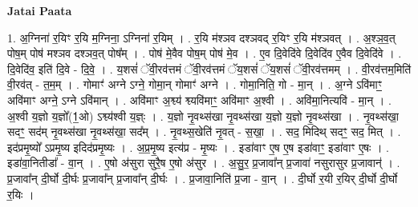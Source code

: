 \documentclass[17pt]{extarticle}
\begin{document}
\textbf{Jatai Paata} \newline

1. अ॒ग्निना॑ र॒यिꣳ र॒यि म॒ग्निना॒ ऽग्निना॑ र॒यिम् । . र॒यि म॑श्ञव दश्ञवद् र॒यिꣳ र॒यि म॑श्ञवत् । . अ॒श्ञ॒व॒त् पोष॒म् पोष॑ मश्ञव दश्ञव॒त् पोष᳚म् । . पोष॑ मे॒वैव पोष॒म् पोष॑ मे॒व । . ए॒व दि॒वेदि॑वे दि॒वेदि॑व ए॒वैव दि॒वेदि॑वे । . दि॒वेदि॑व॒ इति॑ दि॒वे - दि॒वे॒ । . य॒शसं॑ ॅवी॒रव॑त्तमं ॅवी॒रव॑त्तमं ॅय॒शसं॑ ॅय॒शसं॑ ॅवी॒रव॑त्तमम् । . वी॒रव॑त्तम॒मिति॑ वी॒रव॑त् - त॒म॒म् । . गोमाꣳ॑ अग्ने ऽग्ने॒ गोमा॒न् गोमाꣳ॑ अग्ने । . गोमा॒निति॒ गो - मा॒न् । . अ॒ग्ने ऽवि॑माꣳ॒॒ अवि॑माꣳ अग्ने॒ ऽग्ने ऽवि॑मान् । . अवि॑माꣳ अ॒श्व्य॑ श्व्यवि॑माꣳ॒॒ अवि॑माꣳ अ॒श्वी । . अवि॑मा॒नित्यवि॑ - मा॒न् । . अ॒श्वी य॒ज्ञो य॒ज्ञो᳚(1॒ओ) ऽश्व्य॑श्वी य॒ज्ञ्ः । . य॒ज्ञो नृ॒वथ्स॑खा नृ॒वथ्स॑खा य॒ज्ञो य॒ज्ञो नृ॒वथ्स॑खा । . नृ॒वथ्स॑खा॒ सदꣳ॒॒ सद॑म् नृ॒वथ्स॑खा नृ॒वथ्स॑खा॒ सद᳚म् । . नृ॒वथ्स॒खेति॑ नृ॒वत् - स॒खा॒ । . सद॒ मिदिथ् सदꣳ॒॒ सद॒ मित् । . इद॑प्रमृ॒ष्यो᳚ ऽप्रमृ॒ष्य इदिद॑प्रमृ॒ष्यः । . अ॒प्र॒मृ॒ष्य इत्य॑प्र - मृ॒ष्यः । . इडा॑वाꣳ ए॒ष ए॒ष इडा॑वाꣳ॒॒ इडा॑वाꣳ ए॒षः । . इडा॑वा॒नितीडा᳚ - वा॒न् । . ए॒षो अ॑सुरा सुरै॒ष ए॒षो अ॑सुर । . अ॒सु॒र॒ प्र॒जावा᳚न् प्र॒जावा॑ नसुरासुर प्र॒जावान्॑ । . प्र॒जावा᳚न् दी॒र्घो दी॒र्घः प्र॒जावा᳚न् प्र॒जावा᳚न् दी॒र्घः । . प्र॒जावा॒निति॑ प्र॒जा - वा॒न् । . दी॒र्घो र॒यी र॒यिर् दी॒र्घो दी॒र्घो र॒यिः । \newline
\end{document}
